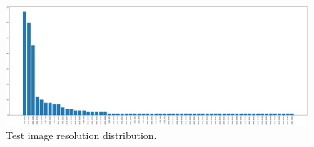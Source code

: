 \begin{figure}[htb!]
  \centering
  \includegraphics[width=\textwidth]{assets/test_image_resolutions.pdf}
  \caption{Test image resolution distribution.}
  \label{figure:3}
\end{figure}



